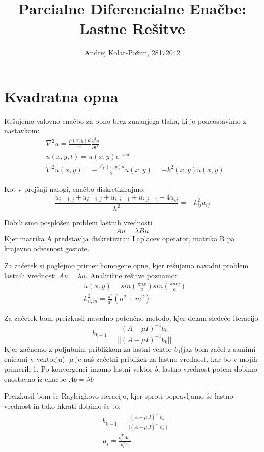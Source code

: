 \documentclass{article}
\title{Parcialne Diferencialne Enačbe: Lastne Rešitve}
\author{Andrej Kolar-Požun, 28172042}
\begin{document}
\maketitle
{}
\section{Kvadratna opna}

Rešujemo valovno enačbo za opno brez zunanjega tlaka, ki jo poneostavimo z nastavkom:
\begin{align*}
&\nabla^2 u = \frac{\rho(x,y) d}{\gamma} \frac{\partial^2 u}{\partial t^2} \\
&u(x,y,t) = u(x,y) e^{- i \omega t} \\
&\nabla ^2 u(x,y) = -\frac{\omega^2 \rho(x,y) d}{\gamma} u(x,y) = -k^2(x,y) u(x,y)
\end{align*}

Kot v prejšnji nalogi, enačbo diskretizirajmo:
\begin{equation*}
\frac{u_{i+1,j} + u_{i-1,j} + u_{i,j+1} +u _{i,j-1} - 4u_{ij}}{h^2} = -k_{ij}^2 u_{ij}
\end{equation*}

Dobili smo posplošen problem lastnih vrednosti
\begin{equation*}
Au=\lambda Bu
\end{equation*}
Kjer matrika A predstavlja diskretiziran Laplacev operator, matrika B pa krajevno odvisnost gostote.


Za začetek si poglejmo primer homogene opne, kjer rešujemo navadni problem lastnih vrednosti $A u = \lambda u$.
Analitične rešitve poznamo:
\begin{align*}
&u(x,y) = sin\left(\frac{\pi n  x}{a}\right)sin\left(\frac{\pi m y}{a}\right) \\
&k^2_{n,m} = \frac{\pi^2}{a^2}(n^2+m^2)
\end{align*}

Za začetek bom preizkusil navadno potenčno metodo, kjer delam sledečo iteracijo:
\begin{equation*}
b_{k+1} = \frac{(A-\mu I)^{-1} b_k}{||(A-\mu I)^{-1} b_k||}
\end{equation*}
Kjer začnemo z poljubnim približkom za lastni vektor $b_0$(jaz bom začel z samimi enicami v vektorju). $\mu$ je naš začetni približek za lastno vrednost, kar bo v mojih primerih 1.
Po konvergenci imamo lastni vektor $b$, lastno vrednost potem dobimo enostavno iz enacbe $A b = \lambda b$

Preizkusil bom še Rayleighovo iteracijo, kjer sproti popravljamo še lastno vrednost in tako hkrati dobimo še to:
\begin{align*}
&b_{k+1} = \frac{(A-\mu_i I)^{-1} b_k}{||(A-\mu_i I)^{-1} b_k||} \\
&\mu_i = \frac{b_i^T A b_i}{b_i^T b_i} 
\end{align*}
\end{document}
